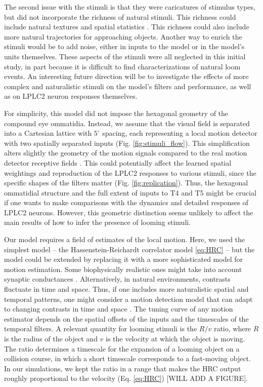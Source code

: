 \documentclass[pdftex,9pt,lineno]{elife}
\begin{document}
The second issue with the stimuli is that they were caricatures of stimulus types, but did not incorporate the richness of natural stimuli. This richness could include natural textures and spatial statistics \citep{ruderman1994statistics}. This richness could also include more natural trajectories for approaching objects. Another way to enrich the stimuli would be to add noise, either in inputs to the model or in the model's units themselves. These aspects of the stimuli were all neglected in this initial study, in part because it is difficult to find characterizations of natural loom events. An interesting future direction will be to investigate the effects of more complex and naturalistic stimuli on the model's filters and performance, as well as on LPLC2 neuron responses themselves. 

For simplicity, this model did not impose the hexagonal geometry of the compound eye ommatidia. Instead, we assume that the visual field is separated into a Cartesian lattice with $5^{\circ}$ spacing, each representing a local motion detector with two spatially separated inputs (Fig. \ref{fig:stimuli_flow}). This simplification alters slightly the geometry of the motion signals compared to the real motion detector receptive fields \citep{shinomiya2019comparisons}. This could potentially affect the learned spatial weightings and reproduction of the LPLC2 responses to various stimuli, since the specific shapes of the filters matter (Fig. \ref{fig:replication}). Thus, the hexagonal ommatidial structure and the full extent of inputs to T4 and T5 might be crucial if one wants to make comparisons with the dynamics and detailed responses of LPLC2 neurons. However, this geometric distinction seems unlikely to affect the main results of how to infer the presence of looming stimuli.

Our model requires a field of estimates of the local motion. Here, we used the simplest model -- the Hassenstein-Reichardt correlator model \ref{eq:HRC} \citep{hassenstein1956systemtheoretische} -- but the model could be extended by replacing it with a more sophisticated model for motion estimation. Some biophysically realistic ones might take into account synaptic conductances \citep{gruntman2018simple,gruntman2019computation,badwan2019dynamic,zavatone2020minimal}. Alternatively, in natural environments, contrasts fluctuate in time and space. Thus, if one includes more naturalistic spatial and temporal patterns, one might consider a motion detection model that can adapt to changing contrasts in time and space  \citep{drews2020dynamic,matulis2020heterogeneous}. The tuning curve of any motion estimator depends on the spatial offsets of the inputs and the timescales of the temporal filters. A relevant quantity for looming stimuli is the $R/v$ ratio, where $R$ is the radius of the object and  $v$ is the velocity at which the object is moving. The ratio determines a timescale for the expansion of a looming object on a collision course, in which a short timescale corresponds to a fast-moving object. In our simulations, we kept the ratio in a range that makes the HRC output roughly proportional to the velocity (Eq. \ref{eq:HRC}) [WILL ADD A FIGURE].
\end{document}
